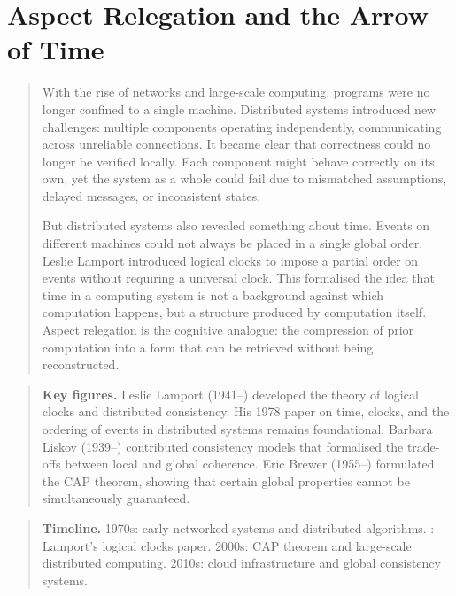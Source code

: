 \documentclass[11pt]{book}
\theoremstyle{plain}
\theoremstyle{definition}
\theoremstyle{remark}
\newenvironment{historicalpreamble}
  {\begin{quote}\small}
  {\end{quote}}
\newenvironment{historicalfigures}
  {\begin{quote}\small\textbf{Key figures.}\enspace\ignorespaces}
  {\end{quote}}
\newenvironment{paradigmtimeline}
  {\begin{quote}\small\textbf{Timeline.}\enspace\ignorespaces}
  {\end{quote}}
\begin{document}
\chapter{Aspect Relegation and the Arrow of Time}
\label{ch:relegation}

\begin{historicalpreamble}
With the rise of networks and large-scale computing, programs were no
longer confined to a single machine. Distributed systems introduced new
challenges: multiple components operating independently, communicating
across unreliable connections. It became clear that correctness could no
longer be verified locally. Each component might behave correctly on its
own, yet the system as a whole could fail due to mismatched assumptions,
delayed messages, or inconsistent states.

But distributed systems also revealed something about time. Events on
different machines could not always be placed in a single global order.
Leslie Lamport introduced logical clocks to impose a partial order on
events without requiring a universal clock. This formalised the idea that
time in a computing system is not a background against which computation
happens, but a structure produced by computation itself. Aspect relegation
is the cognitive analogue: the compression of prior computation into a form
that can be retrieved without being reconstructed.
\end{historicalpreamble}

\begin{historicalfigures}
Leslie Lamport (1941--) developed the theory of logical clocks and
distributed consistency. His 1978 paper on time, clocks, and the ordering
of events in distributed systems remains foundational. Barbara Liskov
(1939--) contributed consistency models that formalised the trade-offs
between local and global coherence. Eric Brewer (1955--) formulated the
CAP theorem, showing that certain global properties cannot be simultaneously
guaranteed.
\end{historicalfigures}

\begin{paradigmtimeline}
1970s: early networked systems and distributed algorithms. : Lamport's logical clocks paper. \quad
2000s: CAP theorem and large-scale distributed computing. \quad
2010s: cloud infrastructure and global consistency systems.
\end{paradigmtimeline}
\end{document}
